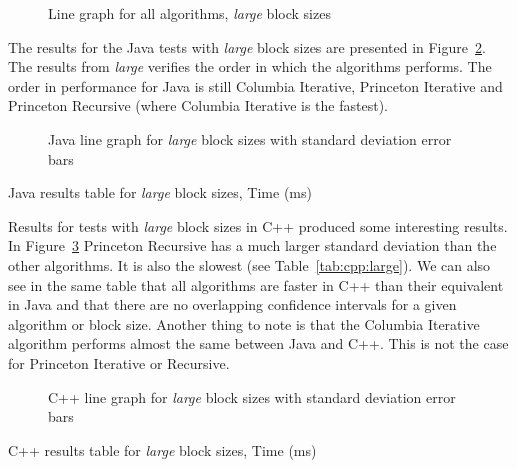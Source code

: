 \ifrelease
\begin{figure}
    \centering
    
    \caption{Line graph for all algorithms, \emph{large} block sizes}
    \label{fig:all:line:large}
\end{figure}
\fi

The results for the Java tests with \emph{large} block sizes are presented in Figure~\ref{fig:java:line:large}. The results from \emph{large} verifies the order in which the algorithms performs. The order in performance for Java is still Columbia Iterative, Princeton Iterative and Princeton Recursive (where Columbia Iterative is the fastest).

\ifrelease
\begin{figure}
    \centering
    
    \caption{Java line graph for \emph{large} block sizes with standard deviation error bars}
    \label{fig:java:line:large}
\end{figure}
\fi
\ifrelease
\begin{table}
    \centering
    \caption{Java results table for \emph{large} block sizes, Time (ms)}
    \label{tab:java:large}
    
\end{table}
\fi

Results for tests with \emph{large} block sizes in C++ produced some interesting results. In Figure~\ref{fig:cpp:line:large} Princeton Recursive has a much larger standard deviation than the other algorithms. It is also the slowest (see Table~\ref{tab:cpp:large}). We can also see in the same table that all algorithms are faster in C++ than their equivalent in Java and that there are no overlapping confidence intervals for a given algorithm or block size. Another thing to note is that the Columbia Iterative algorithm performs almost the same between Java and C++. This is not the case for Princeton Iterative or Recursive.

\ifrelease
\begin{figure}
    \centering
    
    \caption{C++ line graph for \emph{large} block sizes with standard deviation error bars}
    \label{fig:cpp:line:large}
\end{figure}
\fi
\ifrelease
\begin{table}
    \centering
    \caption{C++ results table for \emph{large} block sizes, Time (ms)}
    \label{tab:cpp:large}
    \resizebox{\columnwidth}{!}{%
        
    }
\end{table}
\fi

